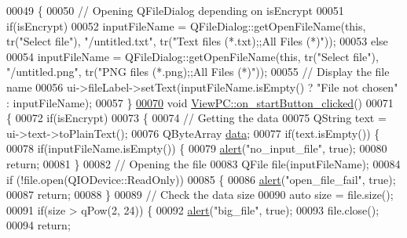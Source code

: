 \begin{DoxyCode}
00049 \{
00050     \textcolor{comment}{// Opening QFileDialog depending on isEncrypt}
00051     \textcolor{keywordflow}{if}(isEncrypt)
00052         inputFileName = QFileDialog::getOpenFileName(\textcolor{keyword}{this}, tr(\textcolor{stringliteral}{"Select file"}), \textcolor{stringliteral}{"/untitled.txt"}, tr(\textcolor{stringliteral}{"Text
       files (*.txt);;All Files (*)"}));
00053     \textcolor{keywordflow}{else}
00054         inputFileName = QFileDialog::getOpenFileName(\textcolor{keyword}{this}, tr(\textcolor{stringliteral}{"Select file"}), \textcolor{stringliteral}{"/untitled.png"}, tr(\textcolor{stringliteral}{"PNG
       files (*.png);;All Files (*)"}));
00055     \textcolor{comment}{// Display the file name}
00056     ui->fileLabel->setText(inputFileName.isEmpty() ? \textcolor{stringliteral}{"File not chosen"} : inputFileName);
00057 \}
\hypertarget{viewpc_8cpp_source_l00070}{}\hyperlink{class_view_p_c_a456d75b7c5d3a089302a576e7359f1f4}{00070} \textcolor{keywordtype}{void} \hyperlink{class_view_p_c_a456d75b7c5d3a089302a576e7359f1f4}{ViewPC::on\_startButton\_clicked}()
00071 \{
00072     \textcolor{keywordflow}{if}(isEncrypt)
00073     \{
00074         \textcolor{comment}{// Getting the data}
00075         QString text = ui->text->toPlainText();
00076         QByteArray \hyperlink{namespace_errors_dict_setup_adf4c30d205d29df7343e26f7c62b0685}{data};
00077         \textcolor{keywordflow}{if}(text.isEmpty()) \{
00078             \textcolor{keywordflow}{if}(inputFileName.isEmpty()) \{
00079                 \hyperlink{class_view_p_c_a7c467169467789561078abc9d4fe57bd}{alert}(\textcolor{stringliteral}{"no\_input\_file"}, \textcolor{keyword}{true});
00080                 \textcolor{keywordflow}{return};
00081             \}
00082             \textcolor{comment}{// Opening the file}
00083             QFile file(inputFileName);
00084             \textcolor{keywordflow}{if} (!file.open(QIODevice::ReadOnly))
00085             \{
00086                 \hyperlink{class_view_p_c_a7c467169467789561078abc9d4fe57bd}{alert}(\textcolor{stringliteral}{"open\_file\_fail"}, \textcolor{keyword}{true});
00087                 \textcolor{keywordflow}{return};
00088             \}
00089             \textcolor{comment}{// Check the data size}
00090             \textcolor{keyword}{auto} size = file.size();
00091             \textcolor{keywordflow}{if}(size > qPow(2, 24)) \{
00092                 \hyperlink{class_view_p_c_a7c467169467789561078abc9d4fe57bd}{alert}(\textcolor{stringliteral}{"big\_file"}, \textcolor{keyword}{true});
00093                 file.close();
00094                 \textcolor{keywordflow}{return};

\end{DoxyCode}
